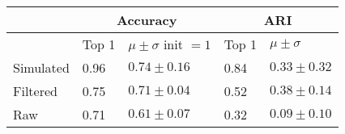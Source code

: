 \begin{tabular}{lllll}
\toprule
{} & \multicolumn{2}{c}{Accuracy} &   \multicolumn{2}{c}{ARI} \\
\midrule
{} & Top 1 &  $\mu \pm \sigma$ init $= 1$ & Top 1 & $\mu \pm \sigma$ \\
Simulated &  0.96 &  $0.74 \pm 0.16 $  & 0.84 &  $0.33 \pm 0.32 $\\
Filtered  & 0.75 &  $0.71 \pm 0.04 $ & 0.52 &  $0.38 \pm 0.14 $\\
Raw & 0.71 &  $0.61 \pm 0.07 $ &  0.32 &  $0.09 \pm 0.10 $   \\
\bottomrule
\end{tabular}